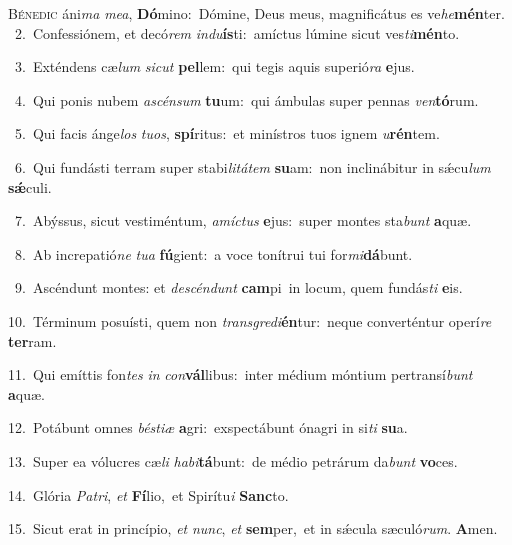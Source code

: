 \lettrine{\initial\textcolor{\initialcolor}{B}}{énedic} áni\textit{ma} \textit{me}\-\textit{a}, \textbf{Dó}\-mino:~\star Dómine, Deus meus, magnificátus es ve\-\textit{he}\-\textbf{mén}ter.\\
{\numbfont\textcolor{\numbcolor}{~2.}}~Confessiónem, et decó\textit{rem} \textit{ind}\-\textit{u}\textbf{ís}ti:~\star amíctus lúmine sicut ves\-\textit{ti}\-\textbf{mén}to.\par
{\numbfont\textcolor{\numbcolor}{~3.}}~Exténdens cæ\textit{lum} \textit{sic}\-\textit{ut} \textbf{pel}\-lem:~\star qui tegis aquis superió\textit{ra} \textbf{e}\-jus.\par
{\numbfont\textcolor{\numbcolor}{~4.}}~Qui ponis nubem \textit{a}\-\textit{scén}\textit{sum} \textbf{tu}\-um:~\star qui ámbulas super pennas \textit{ven}\-\textbf{tó}rum.\par
{\numbfont\textcolor{\numbcolor}{~5.}}~Qui facis ánge\textit{los} \textit{tu}\-\textit{os}, \textbf{spí}\-ritus:~\star et minístros tuos ignem \textit{u}\-\textbf{rén}tem.\par
{\numbfont\textcolor{\numbcolor}{~6.}}~Qui fundásti terram super stabi\-\textit{li}\-\textit{tá}\textit{tem} \textbf{su}\-am:~\star non inclinábitur in sǽcu\textit{lum} \textbf{sǽ}\-culi.\par
{\numbfont\textcolor{\numbcolor}{~7.}}~Abýssus, sicut vestiméntum, \textit{a}\-\textit{míc}\textit{tus} \textbf{e}\-jus:~\star super montes sta\textit{bunt} \textbf{a}\-quæ.\par
{\numbfont\textcolor{\numbcolor}{~8.}}~Ab increpatió\textit{ne} \textit{tu}\-\textit{a} \textbf{fú}\-gient:~\star a voce tonítrui tui for\-\textit{mi}\-\textbf{dá}bunt.\par
{\numbfont\textcolor{\numbcolor}{~9.}}~Ascéndunt montes: et \textit{de}\-\textit{scén}\textit{dunt} \textbf{cam}\-pi~\star in locum, quem fundás\textit{ti} \textbf{e}\-is.\par
{\numbfont\textcolor{\numbcolor}{10.}}~Términum posuísti, quem non \textit{trans}\-\textit{gre}\textit{di}\textbf{én}tur:~\star neque converténtur operí\textit{re} \textbf{ter}\-ram.\par
{\numbfont\textcolor{\numbcolor}{11.}}~Qui emíttis fon\textit{tes} \textit{in} \textit{con}\-\textbf{vál}libus:~\star inter médium móntium pertransí\textit{bunt} \textbf{a}\-quæ.\par
{\numbfont\textcolor{\numbcolor}{12.}}~Potábunt omnes \textit{bés}\-\textit{ti}\textit{æ} \textbf{a}\-gri:~\star exspectábunt ónagri in si\textit{ti} \textbf{su}\-a.\par
{\numbfont\textcolor{\numbcolor}{13.}}~Super ea vólucres cæ\textit{li} \textit{ha}\-\textit{bi}\textbf{tá}bunt:~\star de médio petrárum da\textit{bunt} \textbf{vo}\-ces.\par
{\numbfont\textcolor{\numbcolor}{14.}}~Glória \textit{Pa}\-\textit{tri}, \textit{et} \textbf{Fí}\-lio,~\star et Spirítu\textit{i} \textbf{Sanc}\-to.\par
{\numbfont\textcolor{\numbcolor}{15.}}~Sicut erat in princípio, \textit{et} \textit{nunc}\-, \textit{et} \textbf{sem}\-per,~\star et in sǽcula sæculó\-\textit{rum}\-. \textbf{A}\-men.\par
